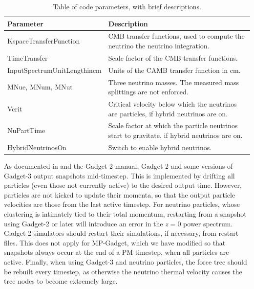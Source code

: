 \documentclass[useAMS, usenatbib]{mnras}
\begin{document}
\begin{table}
\begin{center}
\begin{tabular}{|l|l|}
\hline
    Parameter & Description \\
\hline
KspaceTransferFunction   & CMB transfer functions, used to compute the neutrino the neutrino integration. \\
TimeTransfer             & Scale factor of the CMB transfer functions. \\
InputSpectrumUnitLengthincm   & Units of the CAMB transfer function in cm. \\
MNue, MNum, MNut &  Three neutrino masses. The measured mass splittings are not enforced. \\
Vcrit            & Critical velocity below which the neutrinos are particles, if hybrid neutrinos are on. \\
NuPartTime       & Scale factor at which the particle neutrinos start to gravitate, if hybrid neutrinos are on. \\
HybridNeutrinosOn       & Switch to enable hybrid neutrinos. \\
\hline
\end{tabular}
\end{center}
\caption{Table of code parameters, with brief descriptions.}
\label{tab:parameters}
\end{table}

As documented in \cite{Springel_2005} and the Gadget-2 manual, Gadget-2 and some versions of Gadget-3 output snapshots mid-timestep. This is implemented by drifting all particles (even those not currently active) to the desired output time. However, particles are not kicked to update their momenta, so that the output particle velocities are those from the last active timestep. For neutrino particles, whose clustering is intimately tied to their total momentum, restarting from a snapshot using Gadget-2 or later will introduce an error in the $z=0$ power spectrum. Gadget-2 simulators should restart their simulations, if necessary, from restart files. This does not apply for MP-Gadget, which we have modified so that snapshots always occur at the end of a PM timestep, when all particles are active. Finally, when using Gadget-3 and neutrino particles, the force tree should be rebuilt every timestep, as otherwise the neutrino thermal velocity causes the tree nodes to become extremely large.
\end{document}
